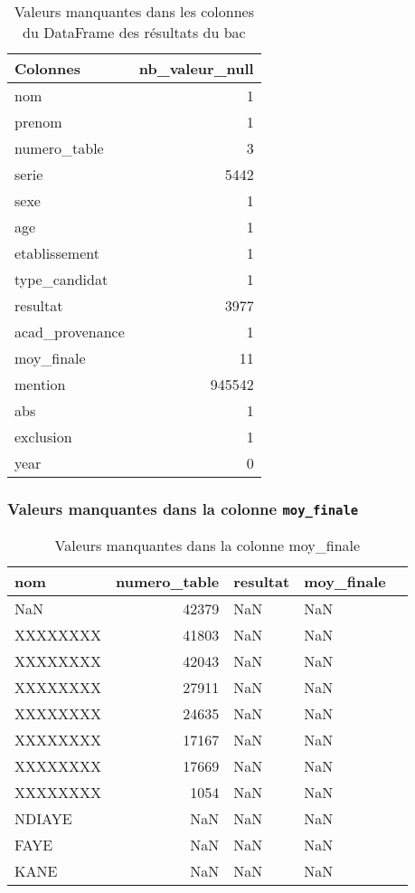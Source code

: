 \begin{table}[h]
\hspace{5cm}
\caption{Valeurs manquantes dans les colonnes du DataFrame des résultats du bac}
\begin{tabular}{lr}
\toprule
Colonnes & nb\_valeur\_null \\
\midrule
nom & 1 \\
prenom & 1 \\
numero\_table & 3 \\
serie & 5442 \\
sexe & 1 \\
age & 1 \\
etablissement & 1 \\
type\_candidat & 1 \\
resultat & 3977 \\
acad\_provenance & 1 \\
moy\_finale & 11 \\
mention & 945542 \\
abs & 1 \\
exclusion & 1 \\
year & 0 \\
\bottomrule
\end{tabular}
\end{table}

\subsubsection{Valeurs manquantes dans la colonne \texttt{moy\_finale}}

\begin{table}[h]
\hspace{5cm}
\caption{Valeurs manquantes dans la colonne moy\_finale}
\begin{tabular}{lrllr}
\toprule
nom & numero\_table & resultat & moy\_finale \\
\midrule
NaN & 42379 & NaN & NaN \\
XXXXXXXX & 41803 & NaN & NaN \\
XXXXXXXX & 42043 & NaN & NaN \\
XXXXXXXX & 27911 & NaN & NaN \\
XXXXXXXX & 24635 & NaN & NaN \\
XXXXXXXX & 17167 & NaN & NaN \\
XXXXXXXX & 17669 & NaN & NaN \\
XXXXXXXX & 1054 & NaN & NaN \\
NDIAYE & NaN & NaN & NaN \\
FAYE & NaN & NaN & NaN \\
KANE & NaN & NaN & NaN \\
\bottomrule
\end{tabular}
\end{table}

